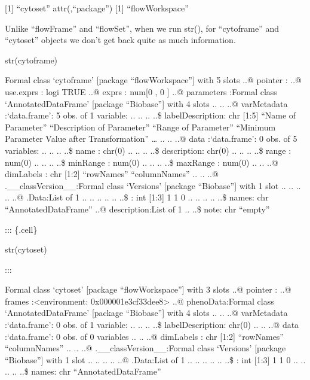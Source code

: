 \documentclass[
  letterpaper,
  DIV=11,
  numbers=noendperiod]{scrartcl}
\newenvironment{Shaded}{\begin{snugshade}}{\end{snugshade}}
\newcommand{\FunctionTok}[1]{\textcolor[rgb]{0.28,0.35,0.67}{#1}}
\newcommand{\NormalTok}[1]{\textcolor[rgb]{0.00,0.23,0.31}{#1}}
\begin{document}
{[}1{]} ``cytoset'' attr(,``package'') {[}1{]} ``flowWorkspace''

Unlike ``flowFrame'' and ``flowSet'', when we run str(), for
``cytoframe'' and ``cytoset'' objects we don't get back quite as much
information.

\begin{Shaded}
\begin{Highlighting}[]
\FunctionTok{str}\NormalTok{(cytoframe)}
\end{Highlighting}
\end{Shaded}

Formal class `cytoframe' {[}package ``flowWorkspace''{]} with 5 slots
..@ pointer : ..@ use.exprs : logi TRUE ..@ exprs : num{[}0 , 0 {]} ..@
parameters :Formal class `AnnotatedDataFrame' {[}package ``Biobase''{]}
with 4 slots .. .. ..@ varMetadata :`data.frame': 5 obs. of 1 variable:
.. .. .. ..\$ labelDescription: chr {[}1:5{]} ``Name of Parameter''
``Description of Parameter'' ``Range of Parameter'' ``Minimum Parameter
Value after Transformation'' \ldots{} .. .. ..@ data :`data.frame': 0
obs. of 5 variables: .. .. .. ..\$ name : chr(0) .. .. .. ..\$
description: chr(0) .. .. .. ..\$ range : num(0) .. .. .. ..\$ minRange
: num(0) .. .. .. ..\$ maxRange : num(0) .. .. ..@ dimLabels : chr
{[}1:2{]} ``rowNames'' ``columnNames'' .. .. ..@
.\_\_classVersion\_\_:Formal class `Versions' {[}package ``Biobase''{]}
with 1 slot .. .. .. .. ..@ .Data:List of 1 .. .. .. .. .. ..\$ : int
{[}1:3{]} 1 1 0 .. .. .. .. ..\$ names: chr ``AnnotatedDataFrame'' ..@
description:List of 1 .. ..\$ note: chr ``empty''

::: \{.cell\}

\begin{Shaded}
\begin{Highlighting}[]
\FunctionTok{str}\NormalTok{(cytoset)}
\end{Highlighting}
\end{Shaded}

:::

Formal class `cytoset' {[}package ``flowWorkspace''{]} with 3 slots ..@
pointer : ..@ frames :\textless environment:
0x000001e3cf33dee8\textgreater{} ..@ phenoData:Formal class
`AnnotatedDataFrame' {[}package ``Biobase''{]} with 4 slots .. .. ..@
varMetadata :`data.frame': 0 obs. of 1 variable: .. .. .. ..\$
labelDescription: chr(0) .. .. ..@ data :`data.frame': 0 obs. of 0
variables .. .. ..@ dimLabels : chr {[}1:2{]} ``rowNames''
``columnNames'' .. .. ..@ .\_\_classVersion\_\_:Formal class `Versions'
{[}package ``Biobase''{]} with 1 slot .. .. .. .. ..@ .Data:List of 1 ..
.. .. .. .. ..\$ : int {[}1:3{]} 1 1 0 .. .. .. .. ..\$ names: chr
``AnnotatedDataFrame''
\end{document}
